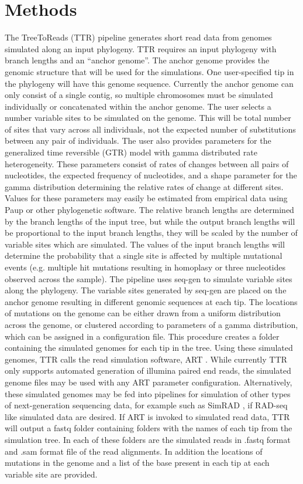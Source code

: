 \documentclass[a4paper,10pt]{article}
\begin{document}
\section{Methods}
The TreeToReads (TTR) pipeline generates short read data from genomes simulated along an input phylogeny.
TTR requires an input phylogeny with branch lengths and an ``anchor genome''. 
The anchor genome provides the genomic structure that will be used for the simulations.
One user-specified tip in the phylogeny will have this genome sequence.
Currently the anchor genome can only consist of a single contig, so multiple chromosomes must be simulated individually or concatenated within the anchor genome.
The user selects a number variable sites to be simulated on the genome.
This will be total number of sites that vary across all individuals, not the expected number of substitutions between any pair of individuals.
The user also provides parameters for the generalized time reversible (GTR) model with gamma distributed rate heterogeneity.
These parameters consist of rates of changes between all pairs of nucleotides, the expected frequency of nucleotides, 
and a shape parameter for the gamma distribution determining the relative rates of change at different sites. 
Values for these parameters may easily be estimated from empirical data using Paup \citep{swofford_paup:_2001} or other phylogenetic software.
The relative branch lengths are determined by the branch lengths of the input tree, but while the output branch lengths will be proportional to the input branch lengths, 
they will be scaled by the number of variable sites which are simulated.
The values of the input branch lengths will determine the probability that a single site is affected by multiple mutational events 
(e.g. multiple hit mutations resulting in homoplasy or three nucleotides observed across the sample).
The pipeline uses seq-gen \citep{rambaut_seq-gen:_1997} to simulate variable sites along the phylogeny.
The variable sites generated by seq-gen are placed on the anchor genome resulting in different genomic sequences at each tip.
The locations of mutations on the genome can be either drawn from a uniform distribution across the genome, 
or clustered according to parameters of a gamma distribution, which can be assigned in a configuration file.
This procedure creates a folder containing the simulated genomes for each tip in the tree.
Using these simulated genomes, TTR calls the read simulation software, ART \citep{huang_art:_2012}.
While currently TTR only supports automated generation of illumina paired end reads, 
the simulated genome files may be used with any ART parameter configuration.
Alternatively, these simulated genomes may be fed into pipelines for simulation of other types of next-generation sequencing data, 
for example such as SimRAD \citep{lepais_simrad:_2014}, if RAD-seq like simulated data are desired.
If ART is invoked to simulated read data, TTR will output a fastq folder containing folders with the names of each tip from the simulation tree. 
In each of these folders are the simulated reads  in .fastq format and .sam format file of the read alignments.
In addition the locations of mutations in the genome and a list of the base present in each tip at each variable site are provided.
\end{document}
